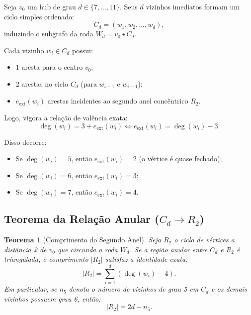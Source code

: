 \documentclass[11pt,a4paper]{article}
\theoremstyle{plain}
\newtheorem{theorem}{Teorema}[section]
\theoremstyle{definition}
\begin{document}
Seja $v_0$ um hub de grau $d \in \{7, \dots, 11\}$. Seus $d$ vizinhos imediatos formam um ciclo simples ordenado:
\begin{equation}
C_d = (w_1, w_2, \dots, w_d),
\end{equation}
induzindo o subgrafo da roda $W_d = v_0 \star C_d$. 

Cada vizinho $w_i \in C_d$ possui:
\begin{itemize}
    \item 1 aresta para o centro $v_0$;
    \item 2 arestas no ciclo $C_d$ (para $w_{i-1}$ e $w_{i+1}$);
    \item $e_{\text{ext}}(w_i)$ arestas incidentes ao segundo anel concêntrico $R_2$.
\end{itemize}
Logo, vigora a relação de valência exata:
\begin{equation}
\deg(w_i) = 3 + e_{\text{ext}}(w_i) \iff e_{\text{ext}}(w_i) = \deg(w_i) - 3.
\end{equation}

Disso decorre:
\begin{itemize}
    \item Se $\deg(w_i) = 5$, então $e_{\text{ext}}(w_i) = 2$ (o vértice é quase fechado);
    \item Se $\deg(w_i) = 6$, então $e_{\text{ext}}(w_i) = 3$;
    \item Se $\deg(w_i) = 7$, então $e_{\text{ext}}(w_i) = 4$.
\end{itemize}

\subsection{Teorema da Relação Anular \texorpdfstring{($C_d \to R_2$)}{(Cd -> R2)}}

\begin{theorem}[Comprimento do Segundo Anel]
Seja $R_2$ o ciclo de vértices a distância 2 de $v_0$ que circunda a roda $W_d$. Se a região anular entre $C_d$ e $R_2$ é triangulada, o comprimento $|R_2|$ satisfaz a identidade exata:
\begin{equation}
|R_2| = \sum_{i=1}^d (\deg(w_i) - 4).
\label{eq:anel_r2}
\end{equation}
Em particular, se $n_5$ denota o número de vizinhos de grau 5 em $C_d$ e os demais vizinhos possuem grau 6, então:
\begin{equation}
|R_2| = 2d - n_5.
\end{equation}
\end{theorem}
\end{document}
